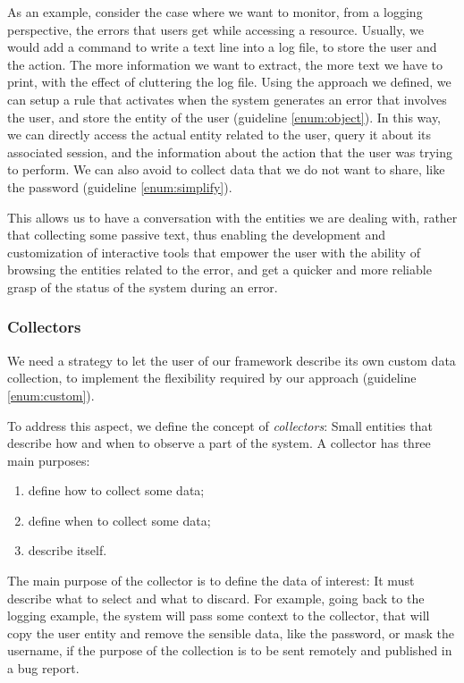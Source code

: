 As an example, consider the case where we want to monitor, from a logging perspective, the errors that users get while accessing a resource.
Usually, we would add a command to write a text line into a log file, to store the user and the action.
The more information we want to extract, the more text we have to print, with the effect of cluttering the log file.
Using the approach we defined, we can setup a rule that activates when the system generates an error that involves the user, and store the entity of the user (guideline \ref{enum:object}).
In this way, we can directly access the actual entity related to the user, query it about its associated session, and the information about the action that the user was trying to perform.
We can also avoid to collect data that we do not want to share, like the password (guideline \ref{enum:simplify}).

This allows us to have a conversation with the entities we are dealing with, rather that collecting some passive text, thus enabling the development and customization of interactive tools that empower the user with the ability of browsing the entities related to the error, and get a quicker and more reliable grasp of the status of the system during an error.


\subsubsection{Collectors}

We need a strategy to let the user of our framework describe its own custom data collection, to implement the flexibility required by our approach (guideline \ref{enum:custom}).

To address this aspect, we define the concept of \emph{collectors}: Small entities that describe how and when to observe a part of the system.
A collector has three main purposes:

\begin{enumerate}
  \item define how to collect some data;
  \item define when to collect some data;
  \item describe itself.
\end{enumerate}

The main purpose of the collector is to define the data of interest: It must describe what to select and what to discard.
For example, going back to the logging example, the system will pass some context to the collector, that will copy the user entity and remove the sensible data, like the password, or mask the username, if the purpose of the collection is to be sent remotely and published in a bug report.

